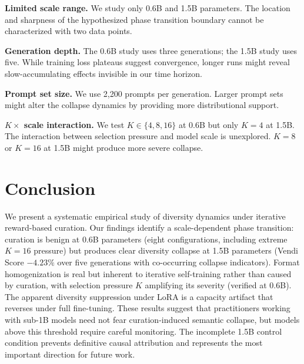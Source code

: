 \documentclass[11pt,a4paper]{article}
\begin{document}
\textbf{Limited scale range.} We study only 0.6B and 1.5B parameters. The location and sharpness of the hypothesized phase transition boundary cannot be characterized with two data points.

\textbf{Generation depth.} The 0.6B study uses three generations; the 1.5B study uses five. While training loss plateaus suggest convergence, longer runs might reveal slow-accumulating effects invisible in our time horizon.

\textbf{Prompt set size.} We use 2,200 prompts per generation. Larger prompt sets might alter the collapse dynamics by providing more distributional support.

\textbf{$K \times$ scale interaction.} We test $K \in \{4, 8, 16\}$ at 0.6B but only $K{=}4$ at 1.5B. The interaction between selection pressure and model scale is unexplored. $K{=}8$ or $K{=}16$ at 1.5B might produce more severe collapse.

\section{Conclusion}

We present a systematic empirical study of diversity dynamics under iterative reward-based curation. Our findings identify a scale-dependent phase transition: curation is benign at 0.6B parameters (eight configurations, including extreme $K{=}16$ pressure) but produces clear diversity collapse at 1.5B parameters (Vendi Score $-4.23\%$ over five generations with co-occurring collapse indicators). Format homogenization is real but inherent to iterative self-training rather than caused by curation, with selection pressure $K$ amplifying its severity (verified at 0.6B). The apparent diversity suppression under LoRA is a capacity artifact that reverses under full fine-tuning. These results suggest that practitioners working with sub-1B models need not fear curation-induced semantic collapse, but models above this threshold require careful monitoring. The incomplete 1.5B control condition prevents definitive causal attribution and represents the most important direction for future work.
\end{document}
